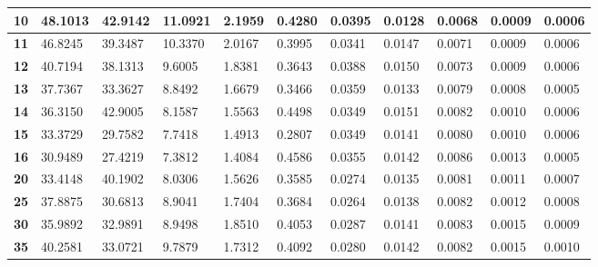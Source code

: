 \begin{table}[ht]
\begin{tabular}{|l|l|l|l|l|l|l|l|l|l|l|}
\textbf{10}      & 48.1013           & 42.9142           & 11.0921           & 2.1959            & 0.4280           & 0.0395           & 0.0128          & 0.0068          & 0.0009          & 0.0006         \\ \hline
\textbf{11}      & 46.8245           & 39.3487           & 10.3370           & 2.0167            & 0.3995           & 0.0341           & 0.0147          & 0.0071          & 0.0009          & 0.0006         \\ \hline
\textbf{12}      & 40.7194           & 38.1313           & 9.6005            & 1.8381            & 0.3643           & 0.0388           & 0.0150          & 0.0073          & 0.0009          & 0.0006         \\ \hline
\textbf{13}      & 37.7367           & 33.3627           & 8.8492            & 1.6679            & 0.3466           & 0.0359           & 0.0133          & 0.0079          & 0.0008          & 0.0005         \\ \hline
\textbf{14}      & 36.3150           & 42.9005           & 8.1587            & 1.5563            & 0.4498           & 0.0349           & 0.0151          & 0.0082          & 0.0010          & 0.0006         \\ \hline
\textbf{15}      & 33.3729           & 29.7582           & 7.7418            & 1.4913            & 0.2807           & 0.0349           & 0.0141          & 0.0080          & 0.0010          & 0.0006         \\ \hline
\textbf{16}      & 30.9489           & 27.4219           & 7.3812            & 1.4084            & 0.4586           & 0.0355           & 0.0142          & 0.0086          & 0.0013          & 0.0005         \\ \hline
\textbf{20}      & 33.4148           & 40.1902           & 8.0306            & 1.5626            & 0.3585           & 0.0274           & 0.0135          & 0.0081          & 0.0011          & 0.0007         \\ \hline
\textbf{25}      & 37.8875           & 30.6813           & 8.9041            & 1.7404            & 0.3684           & 0.0264           & 0.0138          & 0.0082          & 0.0012          & 0.0008         \\ \hline
\textbf{30}      & 35.9892           & 32.9891           & 8.9498            & 1.8510            & 0.4053           & 0.0287           & 0.0141          & 0.0083          & 0.0015          & 0.0009         \\ \hline
\textbf{35}      & 40.2581           & 33.0721           & 9.7879            & 1.7312            & 0.4092           & 0.0280           & 0.0142          & 0.0082          & 0.0015          & 0.0010         \\ \hline

\end{tabular}
\end{table}
